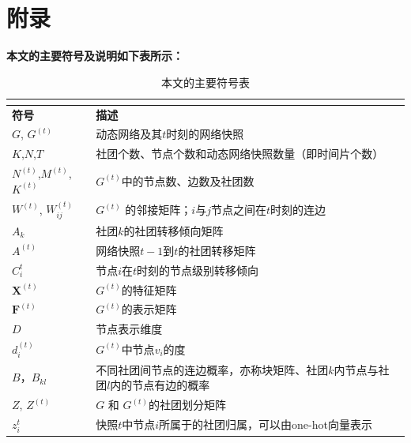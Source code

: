 
\appendix

\chapter*{附录}


\textbf{本文的主要符号及说明如下表所示：}
\begin{center}
	\begin{longtable}{@{}lp{300pt}@{}}
		\caption{本文的主要符号表}\\
		\label{symbols:all}\\
			\toprule[1.5pt]
			{\bfseries 符号} &  { \bfseries 描述} \\
			\midrule[1.0pt]
			$G$, $G^{(t)}$ &  动态网络及其$t$时刻的网络快照 \\
			$K$,$N$,$T$ & 社团个数、节点个数和动态网络快照数量（即时间片个数） \\
			$N^{(t)}$,$M^{(t)}$, $K^{(t)}$ &  $G^{(t)}$中的节点数、边数及社团数 \\
			$W^{(t)}$, $W^{(t)}_{ij}$ &  $G^{(t)}$ 的邻接矩阵；$i$与$j$节点之间在$t$时刻的连边\\
			${A}_k$ & 社团$k$的社团转移倾向矩阵 \\
			$A^{(t)}$ &  网络快照$t-1$到$t$的社团转移矩阵 \\
			${C}_i^{t}$ & 节点$i$在$t$时刻的节点级别转移倾向\\
			$\mathbf{X}^{(t)}$ & $G^{(t)}$的特征矩阵 \\
			$\mathbf{F}^{(t)}$ & $G^{(t)}$的表示矩阵 \\
			$D$ & 节点表示维度 \\
			$d^{(t)}_i$ & $G^{(t)}$中节点$v_i$的度 \\
			$B$，$B_{kl}$ & 不同社团间节点的连边概率，亦称块矩阵、社团$k$内节点与社团$l$内的节点有边的概率\\
			$Z$, $Z^{(t)}$ & $G$ 和 $G^{(t)}$的社团划分矩阵 \\
			$z_i^{t}$ & 快照$t$中节点$i$所属于的社团归属，可以由one-hot向量表示 \\

\end{longtable}
\end{center}
